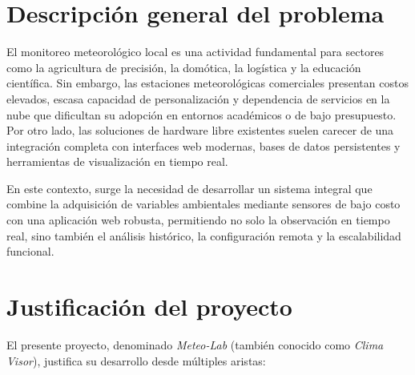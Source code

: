 
\label{ch:introduccion}

\section{Descripción general del problema}

El monitoreo meteorológico local es una actividad fundamental para sectores como la agricultura de precisión, la domótica, la logística y la educación científica. Sin embargo, las estaciones meteorológicas comerciales presentan costos elevados, escasa capacidad de personalización y dependencia de servicios en la nube que dificultan su adopción en entornos académicos o de bajo presupuesto. Por otro lado, las soluciones de hardware libre existentes suelen carecer de una integración completa con interfaces web modernas, bases de datos persistentes y herramientas de visualización en tiempo real.

En este contexto, surge la necesidad de desarrollar un sistema integral que combine la adquisición de variables ambientales mediante sensores de bajo costo con una aplicación web robusta, permitiendo no solo la observación en tiempo real, sino también el análisis histórico, la configuración remota y la escalabilidad funcional.

\section{Justificación del proyecto}

El presente proyecto, denominado \textit{Meteo-Lab} (también conocido como \textit{Clima Visor}), justifica su desarrollo desde múltiples aristas:


